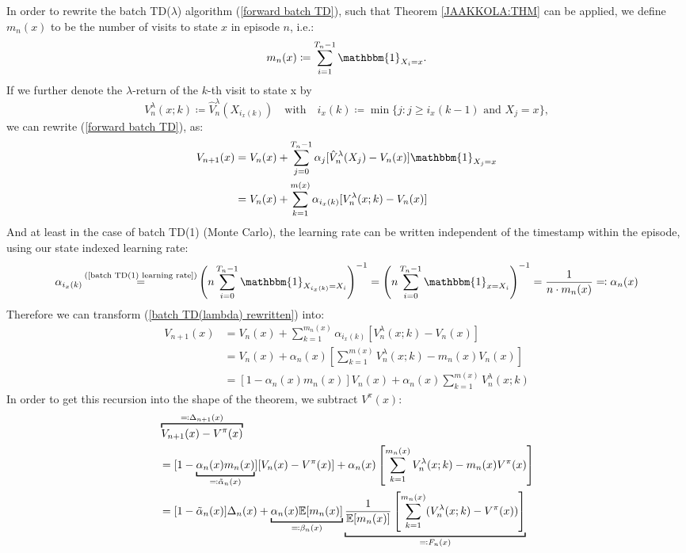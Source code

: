 In order to rewrite the batch TD(\(\lambda\)) algorithm (\ref{forward batch TD}), such that Theorem \ref{JAAKKOLA:THM} can be applied, we define \(m_n(x)\) to be the number of visits to state \(x\) in episode \(n\), i.e.:
\[
    m_n(x)\coloneqq \sum_{i=1}^{T_n-1} \mathbbm{1}_{X_i=x}.
\]
If we further denote the \(\lambda\)-return of the \(k\)-th visit to state x by
\[
    V_n^\lambda(x;k)\coloneqq \hat{V}^\lambda_n(X_{i_x(k)}) \quad \text{with}\quad i_x(k)\coloneqq \min\{j: j\ge i_x(k-1) \text{ and } X_j=x\},
\]
we can rewrite (\ref{forward batch TD}), as:
\begin{align}
    V_{n+1}(x)
    &=V_n(x)+\sum_{j=0}^{T_n-1}\alpha_j [\hat{V}_n^\lambda(X_j)-V_n(x)]\mathbbm{1}_{X_j=x}
    \nonumber \\
    &=V_n(x)+\sum_{k=1}^{m(x)} \alpha_{i_x(k)}[V_n^\lambda(x;k)-V_n(x)] \label{batch TD(lambda) rewritten}
\end{align}
And at least in the case of batch TD(1) (Monte Carlo), the learning rate can be written independent of the timestamp within the episode, using our state indexed learning rate:
\[
    \alpha_{i_x(k)}
    \xeq{\text{(\ref{batch TD(1) learning rate})}} \left(n\sum_{i=0}^{T_n-1}\mathbbm{1}_{X_{i_x(k)}=X_i} \right)^{-1}
    = \left(n\sum_{i=0}^{T_n-1}\mathbbm{1}_{x=X_i} \right)^{-1}=\frac{1}{n\cdot m_n(x)}
    \eqqcolon \alpha_n(x)
\]
Therefore we can transform (\ref{batch TD(lambda) rewritten}) into:
\begin{align*}
    V_{n+1}(x)
    &=V_n(x)+\sum_{k=1}^{m_n(x)} \alpha_{i_x(k)}[V_n^\lambda(x;k)-V_n(x)]\\
    &=V_n(x)+\alpha_n(x)\left[\sum_{k=1}^{m(x)}V_n^\lambda(x;k) - m_n(x) V_n(x)\right]\\
    &=[1-\alpha_n(x)m_n(x)]V_n(x)+\alpha_n(x)\sum_{k=1}^{m(x)}V_n^\lambda(x;k)
\end{align*}
In order to get this recursion into the shape of the theorem, we subtract \(V^\pi(x)\):
\begin{align*}
    &\overbracket[1pt]{V_{n+1}(x)-V^\pi(x)}^{\eqqcolon \Delta_{n+1}(x)}\\
    &= [1-\underbracket[1pt]{\alpha_n(x)m_n(x)}_{\eqqcolon \tilde{\alpha}_n(x)}][V_n(x)-V^\pi(x)]
    + \alpha_n(x)\left[\sum_{k=1}^{m_n(x)}V_n^\lambda(x;k) -m_n(x) V^\pi(x)\right]\\
    &=[1-\tilde{\alpha}_n(x)]\Delta_n(x)
        +\underbracket[1pt]{\alpha_n(x)\E[m_n(x)]}_{\eqqcolon \beta_n(x)}\underbracket[1pt]{
            \frac{1}{\E[m_n(x)]}\left[\sum_{k=1}^{m_n(x)}(V_n^\lambda(x;k) - V^\pi(x))\right]
        }_{
            \eqqcolon F_n(x)
        }
\end{align*}
